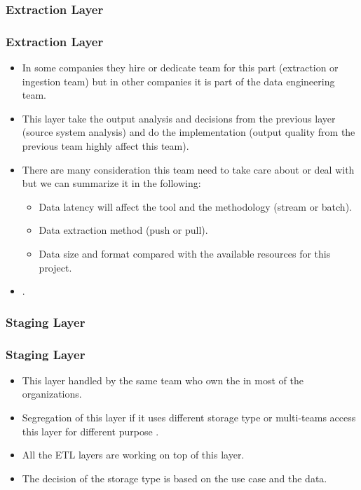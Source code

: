 
\subsubsection{Extraction Layer}

\begin{frame}
\frametitle{Extraction Layer}
\begin{itemize}
	\item In some companies they hire or dedicate team for this part (extraction or ingestion team) but in other companies it is part of the data engineering team.
	\item This layer take the output analysis and decisions from the previous layer (source system analysis) and do the implementation (output quality from the previous team highly affect this team).
	\item There are many consideration this team need to take care about or deal with but we can summarize it in the following:
		\begin{itemize}			
			\item  Data latency will affect the tool and the methodology (stream or batch).
			\item  Data extraction method (push or pull).
			\item  Data size and format compared with the available resources for this project.
		\end{itemize}
	\item {}.

\end{itemize}

\end{frame}


\subsubsection{Staging Layer}

\begin{frame}
\frametitle{Staging Layer}
\begin{itemize}
	\item This layer handled by the same team who own the  in most of the organizations. 
	\item Segregation of this layer if it uses different storage type or multi-teams access this layer for different purpose  .
	\item All the ETL layers are working on top of this layer.
	\item The decision of the storage type is based on the use case and the data.
	
\end{itemize}

\end{frame}

